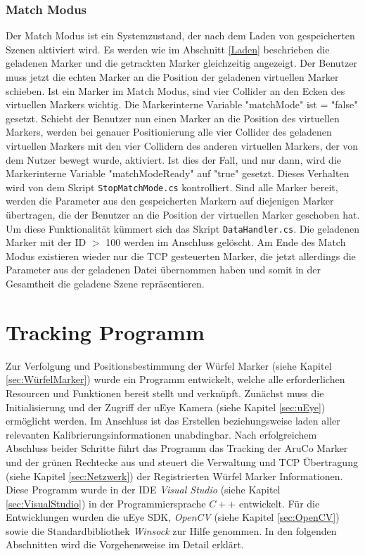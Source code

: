 \subsubsection{Match Modus}
\label{MatchModus}
Der Match Modus ist ein Systemzustand, der nach dem Laden von gespeicherten Szenen aktiviert wird. Es werden wie im Abschnitt \ref{Laden} beschrieben die geladenen Marker und die getrackten Marker gleichzeitig angezeigt. Der Benutzer muss jetzt die echten Marker an die Position der geladenen virtuellen Marker schieben. Ist ein Marker im Match Modus, sind vier Collider an den Ecken des virtuellen Markers wichtig. Die Markerinterne Variable "matchMode" ist = "false" gesetzt. Schiebt der Benutzer nun einen Marker an die Position des virtuellen Markers, werden bei genauer Positionierung alle vier Collider des geladenen virtuellen Markers mit den vier Collidern des anderen virtuellen Markers, der von dem Nutzer bewegt wurde, aktiviert. Ist dies der Fall, und nur dann, wird die Markerinterne Variable "matchModeReady" auf "true" gesetzt. Dieses Verhalten wird von dem Skript \texttt{StopMatchMode.cs} kontrolliert.
Sind alle Marker bereit, werden die Parameter aus den gespeicherten Markern auf diejenigen Marker übertragen, die der Benutzer an die Position der virtuellen Marker geschoben hat. Um diese Funktionalität kümmert sich das Skript \texttt{DataHandler.cs}. 
Die geladenen Marker mit der ID $>$ 100 werden im Anschluss gelöscht. Am Ende des Match Modus existieren wieder nur die TCP gesteuerten Marker, die jetzt allerdings die Parameter aus der geladenen Datei übernommen haben und somit in der Gesamtheit die geladene Szene repräsentieren.

\section{Tracking Programm} \label{sec:Tracking}
Zur Verfolgung und Positionsbestimmung der Würfel Marker (siehe Kapitel \ref{sec:WürfelMarker}) wurde ein Programm entwickelt, welche alle erforderlichen Resourcen und Funktionen bereit stellt und verknüpft. Zunächst muss die Initialisierung und der Zugriff der uEye Kamera (siehe Kapitel \ref{sec:uEye}) ermöglicht werden. Im Anschluss ist das Erstellen beziehungsweise laden aller relevanten Kalibrierungsinformationen unabdingbar. Nach erfolgreichem Abschluss beider Schritte führt das Programm  das Tracking der AruCo Marker und der grünen Rechtecke aus und steuert die Verwaltung und TCP Übertragung (siehe Kapitel \ref{sec:Netzwerk}) der Registrierten Würfel Marker Informationen. Diese Programm wurde in der IDE \textit{Visual Studio} (siehe Kapitel \ref{sec:VisualStudio}) in der Programmiersprache $C++$ entwickelt. Für die Entwicklungen wurden die uEye SDK, \textit{OpenCV} (siehe Kapitel \ref{sec:OpenCV}) sowie die Standardbibliothek \textit{Winsock} zur Hilfe genommen. In den folgenden Abschnitten wird die Vorgehensweise im Detail erklärt.

